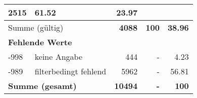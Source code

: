 \begin{longtable}{lXrrr}
       \num{2515} &
       \num[round-mode=places,round-precision=2]{61,52} &
         \num[round-mode=places,round-precision=2]{23,97} \\
     \midrule
     \multicolumn{2}{l}{Summe (gültig)} &
       \textbf{\num{4088}} &
     \textbf{100} &
       \textbf{\num[round-mode=places,round-precision=2]{38,96}} \\
     \multicolumn{5}{l}{\textbf{Fehlende Werte}}\\
       -998 &
       keine Angabe &
         \num{444} &
        - &
         \num[round-mode=places,round-precision=2]{4,23} \\
       -989 &
       filterbedingt fehlend &
         \num{5962} &
        - &
         \num[round-mode=places,round-precision=2]{56,81} \\
     \midrule
     \multicolumn{2}{l}{\textbf{Summe (gesamt)}} &
          \textbf{\num{10494}} &
        \textbf{-} &
        \textbf{100} \\
     \bottomrule
     \end{longtable}
     
